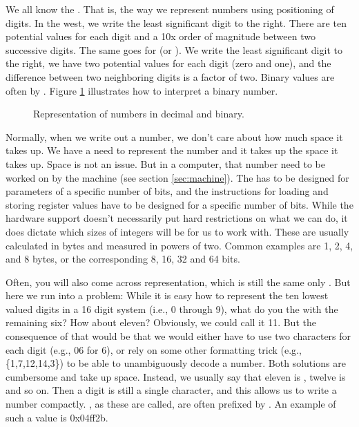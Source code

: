 We all know the . That is, the way we represent numbers using  positioning of digits. In the west, we write the least significant digit to the right. There are ten potential values for each digit and a 10x order of magnitude between two successive digits. The same goes for  (or ). We write the least significant digit to the right, we have two potential values for each digit (zero and one), and the difference between two neighboring digits is a factor of two. Binary values are often  by . Figure \ref{fig:prim:int:repr:base} illustrates how to interpret a binary number.

\begin{figure}[tbp]
  
  \caption{Representation of numbers in decimal and binary.}
  \label{fig:prim:int:repr:base}
\end{figure}

Normally, when we write out a number, we don't care about how much space it takes up. We have a need to represent the number and it takes up the space it takes up. Space is not an issue. But in a computer, that number need to be worked on by the machine (see section \ref{sec:machine}). The  has to be designed for parameters of a specific number of bits, and the instructions for loading and storing register values have to be designed for a specific number of bits. While the hardware support doesn't necessarily put hard restrictions on what we can do, it does dictate which sizes of integers will be  for us to work with. These are usually calculated in bytes and measured in powers of two. Common examples are 1, 2, 4, and 8 bytes, or the corresponding 8, 16, 32 and 64 bits.

Often, you will also come across  representation, which is still the same only . But here we run into a problem: While it is easy how to represent the ten lowest valued digits in a 16 digit system (i.e., 0 through 9), what do you the with the remaining six? How about eleven? Obviously, we could call it 11. But the consequence of that would be that we would either have to use two characters for each digit (e.g., 06 for 6), or rely on some other formatting trick (e.g., \{1,7,12,14,3\}) to be able to unambiguously decode a number. Both solutions are cumbersome and take up space. Instead, we usually say that eleven is , twelve is  and so on. Then a digit is still a single character, and this allows us to write a number compactly. , as these are called, are often prefixed by . An example of such a value is 0x04ff2b.

